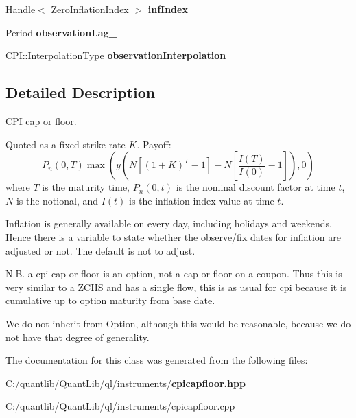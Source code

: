 \begin{DoxyCompactItemize}
\item 
Handle$<$ Zero\+Inflation\+Index $>$ {\bfseries inf\+Index\+\_\+}\label{class_quant_lib_1_1_c_p_i_cap_floor_ae3dc75849e48462434fde5b19734db44}

\item 
Period {\bfseries observation\+Lag\+\_\+}\label{class_quant_lib_1_1_c_p_i_cap_floor_a0b6fd82e776d4669219aad811bc78c48}

\item 
C\+P\+I\+::\+Interpolation\+Type {\bfseries observation\+Interpolation\+\_\+}\label{class_quant_lib_1_1_c_p_i_cap_floor_acc352da92497132358c2f041ced85b0b}

\end{DoxyCompactItemize}


\subsection{Detailed Description}
C\+PI cap or floor. 

Quoted as a fixed strike rate $ K $. Payoff\+: \[ P_n(0,T) \max(y (N [(1+K)^{T}-1] - N \left[ \frac{I(T)}{I(0)} -1 \right]), 0) \] where $ T $ is the maturity time, $ P_n(0,t) $ is the nominal discount factor at time $ t $, $ N $ is the notional, and $ I(t) $ is the inflation index value at time $ t $.

Inflation is generally available on every day, including holidays and weekends. Hence there is a variable to state whether the observe/fix dates for inflation are adjusted or not. The default is not to adjust.

N.\+B. a cpi cap or floor is an option, not a cap or floor on a coupon. Thus this is very similar to a Z\+C\+I\+IS and has a single flow, this is as usual for cpi because it is cumulative up to option maturity from base date.

We do not inherit from Option, although this would be reasonable, because we do not have that degree of generality. 

The documentation for this class was generated from the following files\+:\begin{DoxyCompactItemize}
\item 
C\+:/quantlib/\+Quant\+Lib/ql/instruments/{\bf cpicapfloor.\+hpp}\item 
C\+:/quantlib/\+Quant\+Lib/ql/instruments/cpicapfloor.\+cpp\end{DoxyCompactItemize}

